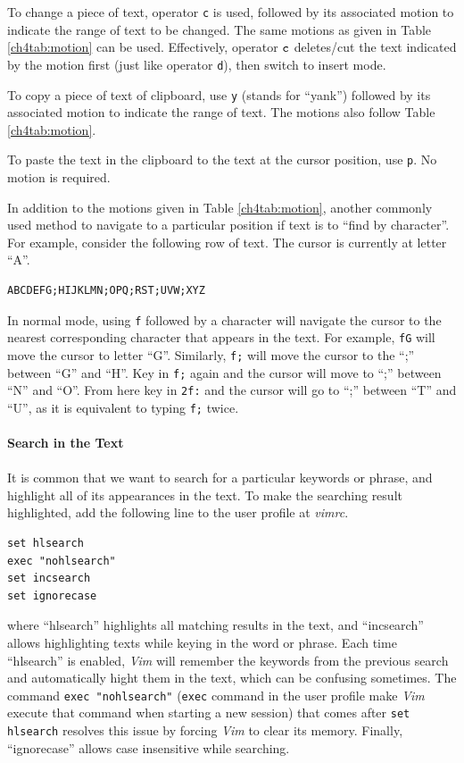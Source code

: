To change a piece of text, operator \verb|c| is used, followed by its associated motion to indicate the range of text to be changed. The same motions as given in Table \ref{ch4tab:motion} can be used. Effectively, operator $\verb|c|$ deletes/cut the text indicated by the motion first (just like operator \verb|d|), then switch to insert mode.

To copy a piece of text of clipboard, use \verb|y| (stands for ``yank'') followed by its associated motion to indicate the range of text. The motions also follow Table \ref{ch4tab:motion}.

To paste the text in the clipboard to the text at the cursor position, use \verb|p|. No motion is required.

In addition to the motions given in Table \ref{ch4tab:motion}, another commonly used method to navigate to a particular position if text is to ``find by character''. For example, consider the following row of text. The cursor is currently at letter ``A''.
\begin{verbatim}
ABCDEFG;HIJKLMN;OPQ;RST;UVW;XYZ
\end{verbatim}
In normal mode, using \verb|f| followed by a character will navigate the cursor to the nearest corresponding character that appears in the text. For example, \verb|fG| will move the cursor to letter ``G''. Similarly, \verb|f;| will move the cursor to the ``;'' between ``G'' and ``H''. Key in \verb|f;| again and the cursor will move to ``;'' between ``N'' and ``O''. From here key in \verb|2f:| and the cursor will go to ``;'' between ``T'' and ``U'', as it is equivalent to typing \verb|f;| twice.
\\
\\
\noindent \textbf{Search in the Text}
\\
\\
It is common that we want to search for a particular keywords or phrase, and highlight all of its appearances in the text. To make the searching result highlighted, add the following line to the user profile at \textit{vimrc}.
\begin{verbatim}
set hlsearch
exec "nohlsearch"
set incsearch
set ignorecase
\end{verbatim}
where ``hlsearch'' highlights all matching results in the text, and ``incsearch'' allows highlighting texts while keying in the word or phrase. Each time ``hlsearch'' is enabled, \textit{Vim} will remember the keywords from the previous search and automatically hight them in the text, which can be confusing sometimes. The command \verb|exec "nohlsearch"| (\verb|exec| command in the user profile make \textit{Vim} execute that command when starting a new session) that comes after \verb|set hlsearch| resolves this issue by forcing \textit{Vim} to clear its memory. Finally, ``ignorecase'' allows case insensitive while searching.

